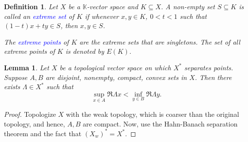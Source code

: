 \documentclass[11pt]{article}
\theoremstyle{thmstyle}
\newtheorem{lemma}[theorem]{Lemma}
\theoremstyle{defstyle}
\newtheorem{definition}[theorem]{Definition}
\newcommand{\R}{\mathbb{R}}
\newcommand{\bbC}{\mathbb{C}}
\newcommand{\K}{\mathbb{K}} %
\newcommand{\define}[1]{\textcolor{blue}{\textit{#1}}}
\begin{document}
\begin{definition}
    Let $X$ be a $\K$-vector space and $K\subseteq X$. A non-empty set $S\subseteq K$ is called an \define{extreme set} of $K$ if whenever $x,y\in K$, $0 < t < 1$ such that $(1 - t)x + ty\in S$, then $x,y\in S$.

    The \define{extreme points} of $K$ are the extreme sets that are singletons. The set of all extreme points of $K$ is denoted by $E(K)$.
\end{definition}

\begin{lemma}
    Let $X$ be a topological vector space on which $X^\ast$ separates points. Suppose $A, B$ are disjoint, nonempty, compact, convex sets in $X$. Then there exists $\Lambda\in X^\ast$ such that 
    \begin{equation*}
        \sup_{x\in A}\Re\Lambda x < \inf_{y\in B}\Re\Lambda y.
    \end{equation*}
\end{lemma}
\begin{proof}
    Topologize $X$ with the weak topology, which is coarser than the original topology, and hence, $A, B$ are compact. Now, use the Hahn-Banach separation theorem and the fact that $(X_w)^\ast = X^\ast$.
\end{proof}
\end{document}
